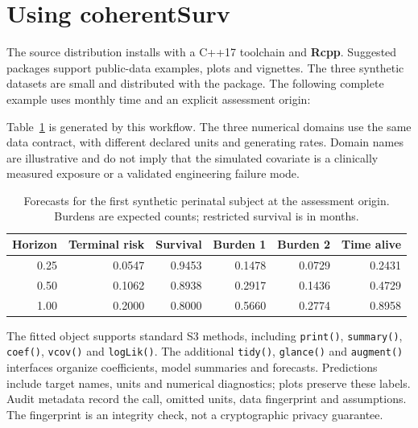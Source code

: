 \documentclass[article,nojss]{jss}
\newcommand{\pkg}[1]{\textbf{#1}}
\newcommand{\code}[1]{\texttt{#1}}
\newenvironment{CodeChunk}{}{}
\begin{document}
\section[Using coherentSurv]{Using \pkg{coherentSurv}}\label{sec:using}
The source distribution installs with a C++17 toolchain and \pkg{Rcpp}. Suggested packages support public-data examples, plots and vignettes. The three synthetic datasets are small and distributed with the package. The following complete example uses monthly time and an explicit assessment origin:
\begin{CodeChunk}
\end{CodeChunk}
Table~\ref{tab:quickstart} is generated by this workflow. The three numerical domains use the same data contract, with different declared units and generating rates. Domain names are illustrative and do not imply that the simulated covariate is a clinically measured exposure or a validated engineering failure mode.
\begin{table}[tbp]
\centering\small
\begin{tabular}{rrrrrr}
\toprule
Horizon & Terminal risk & Survival & Burden 1 & Burden 2 & Time alive \\
\midrule
0.25 & 0.0547 & 0.9453 & 0.1478 & 0.0729 & 0.2431 \\
0.50 & 0.1062 & 0.8938 & 0.2917 & 0.1436 & 0.4729 \\
1.00 & 0.2000 & 0.8000 & 0.5660 & 0.2774 & 0.8958 \\
\bottomrule
\end{tabular}
\caption{Forecasts for the first synthetic perinatal subject at the assessment origin. Burdens are expected counts; restricted survival is in months.}\label{tab:quickstart}
\end{table}


The fitted object supports standard S3 methods, including \code{print()}, \code{summary()}, \code{coef()}, \code{vcov()} and \code{logLik()}. The additional \code{tidy()}, \code{glance()} and \code{augment()} interfaces organize coefficients, model summaries and forecasts. Predictions include target names, units and numerical diagnostics; plots preserve these labels. Audit metadata record the call, omitted units, data fingerprint and assumptions. The fingerprint is an integrity check, not a cryptographic privacy guarantee.
\end{document}

